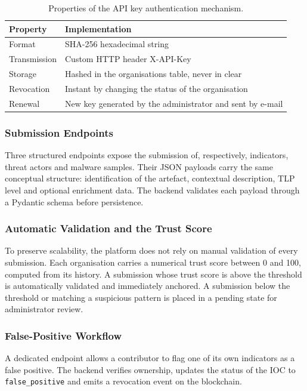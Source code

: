 \documentclass[12pt,a4paper,oneside]{book}
\begin{document}
{{\begin{table}[!h]
\caption{Properties of the API key authentication mechanism.}
\label{tab:apikey}
\centering
\renewcommand{\arraystretch}{1.4}
\begin{tabular}{| C{.20\textwidth} | p{.70\textwidth} |}
\hline
\textbf{Property} & \textbf{Implementation} \\
\hline\hline
Format        & \nohyphens{SHA-256 hexadecimal string} \\
\hline
Transmission  & \nohyphens{Custom HTTP header X-API-Key} \\
\hline
Storage       & \nohyphens{Hashed in the organisations table, never in clear} \\
\hline
Revocation    & \nohyphens{Instant by changing the status of the organisation} \\
\hline
Renewal       & \nohyphens{New key generated by the administrator and sent by e-mail} \\
\hline
\end{tabular}
\end{table}

\subsubsection{Submission Endpoints}
Three structured endpoints expose the submission of, respectively,
indicators, threat actors and malware samples. Their JSON payloads carry
the same conceptual structure: identification of the artefact, contextual
description, TLP level and optional enrichment data. The backend validates
each payload through a Pydantic schema before persistence.

\subsubsection{Automatic Validation and the Trust Score}
To preserve scalability, the platform does not rely on manual validation of
every submission. Each organisation carries a numerical trust score between
0 and 100, computed from its history. A submission whose trust score is
above the threshold is automatically validated and immediately anchored. A
submission below the threshold or matching a suspicious pattern is placed
in a pending state for administrator review.

\subsubsection{False-Positive Workflow}
A dedicated endpoint allows a contributor to flag one of its own indicators
as a false positive. The backend verifies ownership, updates the status of
the IOC to \texttt{false\_positive} and emits a revocation event on the
blockchain.

}}
\end{document}
